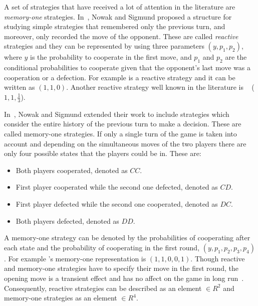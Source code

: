 A set of strategies that have received a lot of attention in
the literature are \textit{memory-one} strategies. In~\cite{Nowak1989},
Nowak and Sigmund proposed a structure for studying simple strategies that
remembered only the previous turn, and moreover, only recorded the move of the
opponent. These are called \textit{reactive} strategies and they can be
represented by using three parameters \((y, p_1, p_2)\), where \(y\) is the
probability to cooperate in the first move, and \(p_1\) and \(p_2\) are the
conditional probabilities to cooperate given that the opponent's last move was
a cooperation or a defection. For example \TitForTat is a reactive strategy and
it can be written as \((1, 1, 0)\). Another reactive strategy well known in
the literature is \GenerousTitForTat~\cite{Nowak1992} (\(1, 1, \frac{1}{3}\)).

In~\cite{Nowak1990}, Nowak and Sigmund extended
their work to include strategies which consider the entire history of the previous turn to make a decision.
These are called memory-one strategies.
If only a single turn of the game is taken into account and depending on the
simultaneous moves of the two players there are only four possible states that
the players could be in. These are:

\begin{itemize}
    \item Both players cooperated, denoted as \(CC\).
    \item First player cooperated while the second one defected, denoted as \(CD\).
    \item First player defected while the second one cooperated, denoted as \(DC\).
    \item Both players defected, denoted as \(DD\).
\end{itemize}

A memory-one strategy can be denoted by the probabilities of cooperating
after each state and the probability of cooperating in the first round, \((y,
p_1, p_2, p_3, p_4)\). For example \Pavlov's memory-one representation is \((1,
1, 0, 0, 1)\). Though reactive and memory-one strategies have to specify their
move in the first round, the opening move is a transient effect and has no affect
on the game in long run~\cite{sigmund2010calculus}. Consequently, reactive strategies
can be described as an element \(\in R^2\) and memory-one strategies as an element
\(\in R^4\).

